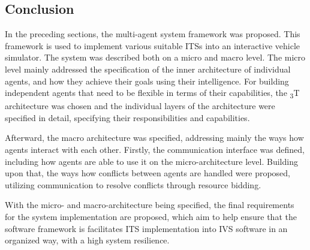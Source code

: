 \documentclass[0main.tex]{subfiles}
\begin{document}
\subsection{Conclusion}

In the preceding sections, the multi-agent system framework was proposed. This framework is used to implement various 
suitable ITSs into an interactive vehicle simulator. The system was described both on a micro and macro level. The micro level 
mainly addressed the specification of the inner architecture of individual agents, and how they achieve their goals using their 
intelligence. For building independent agents that need to be flexible in terms of their capabilities, the \textsubscript{3}T
architecture was chosen and the individual layers of the architecture were specified in detail, specifying their responsibilities
and capabilities. 

Afterward, the macro architecture was specified, addressing mainly the ways how agents interact with each other. 
Firstly, the communication interface was defined, including how agents are able to use it on the micro-architecture level.
Building upon that, the ways how conflicts between agents are handled were proposed, utilizing communication to resolve 
conflicts through resource bidding. 

With the micro- and macro-architecture being specified, the final requirements for the system implementation are proposed, 
which aim to help ensure that the software framework is facilitates ITS implementation into IVS software in an 
organized way, with a high system resilience.

\clearpage
\end{document}
